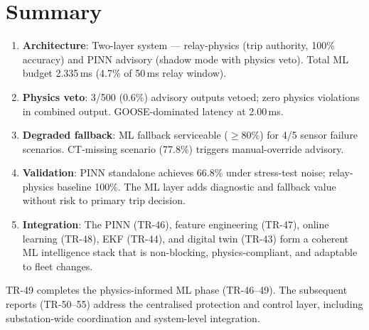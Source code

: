 \documentclass[11pt,a4paper]{article}
\begin{document}
\section{Summary}
\label{sec:summary}

\begin{enumerate}
  \item \textbf{Architecture}: Two-layer system --- relay-physics (trip
    authority, 100\% accuracy) and PINN advisory (shadow mode with physics
    veto).  Total ML budget 2.335\,ms (4.7\% of 50\,ms relay window).

  \item \textbf{Physics veto}: 3/500 (0.6\%) advisory outputs vetoed;
    zero physics violations in combined output.  GOOSE-dominated latency
    at 2.00\,ms.

  \item \textbf{Degraded fallback}: ML fallback serviceable ($\geq80\%$)
    for 4/5 sensor failure scenarios.  CT-missing scenario (77.8\%) triggers
    manual-override advisory.

  \item \textbf{Validation}: PINN standalone achieves 66.8\% under
    stress-test noise; relay-physics baseline 100\%.  The ML layer adds
    diagnostic and fallback value without risk to primary trip decision.

  \item \textbf{Integration}: The PINN (TR-46), feature engineering (TR-47),
    online learning (TR-48), EKF (TR-44), and digital twin (TR-43) form a
    coherent ML intelligence stack that is non-blocking, physics-compliant,
    and adaptable to fleet changes.
\end{enumerate}

\noindent
TR-49 completes the physics-informed ML phase (TR-46--49).  The subsequent
reports (TR-50--55) address the centralised protection and control layer,
including substation-wide coordination and system-level integration.



\end{document}
